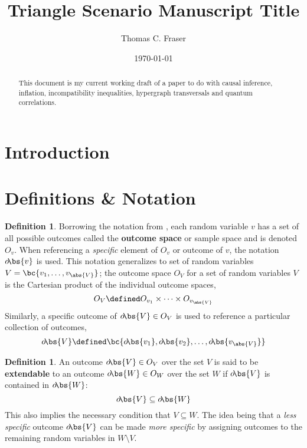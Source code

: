 \documentclass[aps, 10pt, english, twoside, pra, longbibliography]{revtex4-1}
\theoremstyle{plain}
\theoremstyle{definition}
\newtheorem{definition}[theorem]{Definition}
\theoremstyle{remark}
\newcommand{\term}[1]{\textcolor{Mahogany}{\textbf{#1}}}
\newcommand{\outc}[1]{o\!\bs{#1}}
\begin{document}
    \title{Triangle Scenario Manuscript Title}
    \author{Thomas C. Fraser}
    \date{\today}
    \begin{abstract}
        This document is my current working draft of a paper to do with causal inference, inflation, incompatibility inequalities, hypergraph transversals and quantum correlations.
    \end{abstract}
    \maketitle

    \section{Introduction}
    \section{Definitions \& Notation}

    \begin{definition}
        Borrowing the notation from \cite{Fritz_2014}, each random variable $v$ has a set of all possible outcomes called the \term{outcome space} or sample space and is denoted $O_v$. When referencing a \textit{specific} element of $O_v$ or outcome of $v$, the notation $\outc{v}$ is used. This notation generalizes to set of random variables $V = \bc{v_1, \ldots, v_{\abs{V}}}$; the outcome space $O_V$ for a set of random variables $V$ is the Cartesian product of the individual outcome spaces,
        \[ O_V \defined O_{v_1} \times \cdots \times O_{v_{\abs{V}}} \]
        Similarly, a specific outcome of $\outc{V} \in O_V$ is used to reference a particular collection of outcomes,
        \[ \outc{V} \defined \bc{\outc{v_1}, \outc{v_2}, \ldots, \outc{v_{\abs{V}}} } \]
    \end{definition}

    \begin{definition}
        \label{def:extendable}
        An outcome $\outc{V} \in O_V$ over the set $V$ is said to be \term{extendable} to an outcome $\outc{W} \in O_W$ over the set $W$ if $\outc{V}$ is contained in $\outc{W}$:
        \[ \outc{V} \subseteq \outc{W} \]
        This also implies the necessary condition that $V \subseteq W$. The idea being that a \textit{less specific} outcome $\outc{V}$ can be made \textit{more specific} by assigning outcomes to the remaining random variables in $W \setminus V$.
    \end{definition}
\end{document}
